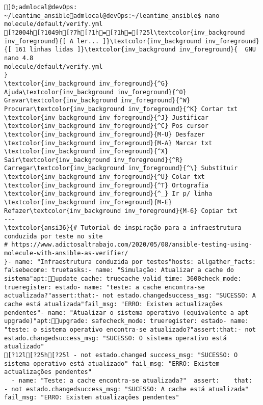 \documentclass{scrartcl}
\title{}
\begin{document}
\begin{Verbatim}
]0;admlocal@devOps: ~/leantime_ansibleadmlocal@devOps:~/leantime_ansible$ nano molecule/default/verify.yml 
[?2004h[?1049h[?7h[?1h=[?1h=[?25l\textcolor{inv_background inv_foreground}{[ A ler... ]}\textcolor{inv_background inv_foreground}{[ 161 linhas lidas ]}\textcolor{inv_background inv_foreground}{  GNU nano 4.8                                          molecule/default/verify.yml                                                       }
\textcolor{inv_background inv_foreground}{^G} Ajuda\textcolor{inv_background inv_foreground}{^O} Gravar\textcolor{inv_background inv_foreground}{^W} Procurar\textcolor{inv_background inv_foreground}{^K} Cortar txt    \textcolor{inv_background inv_foreground}{^J} Justificar    \textcolor{inv_background inv_foreground}{^C} Pos cursor    \textcolor{inv_background inv_foreground}{M-U} Desfazer     \textcolor{inv_background inv_foreground}{M-A} Marcar txt
\textcolor{inv_background inv_foreground}{^X} Sair\textcolor{inv_background inv_foreground}{^R} Carregar\textcolor{inv_background inv_foreground}{^\} Substituir    \textcolor{inv_background inv_foreground}{^U} Colar txt     \textcolor{inv_background inv_foreground}{^T} Ortografia    \textcolor{inv_background inv_foreground}{^_} Ir p/ linha   \textcolor{inv_background inv_foreground}{M-E} Refazer\textcolor{inv_background inv_foreground}{M-6} Copiar txt
---
\textcolor{ansi36}{# Tutorial de inspiração para a infraestrutura conduzida por teste no site
# https://www.adictosaltrabajo.com/2020/05/08/ansible-testing-using-molecule-with-ansible-as-verifier/
}- name: "Infraestrutura conduzida por testes"hosts: allgather_facts: falsebecome: truetasks:- name: "Simulação: Atualizar a cache do sistema"apt:update_cache: truecache_valid_time: 3600check_mode: trueregister: estado- name: "teste: a cache encontra-se actualizada?"assert:that:- not estado.changedsuccess_msg: "SUCESSO: A cache está atualizada"fail_msg: "ERRO: Existem actualizações pendentes"- name: "Atualizar o sistema operativo (equivalente a apt upgrade)"apt:upgrade: safecheck_mode: trueregister: estado- name: "teste: o sistema operativo encontra-se atualizado?"assert:that:- not estado.changedsuccess_msg: "SUCESSO: O sistema operativo está atualizado"
[?12l[?25h[?25l - not estado.changed success_msg: "SUCESSO: O sistema operativo está atualizado" fail_msg: "ERRO: Existem actualizações pendentes"
  - name: "Teste: a cache encontra-se atualizada?"  assert:    that:    - not estado.changedsuccess_msg: "SUCESSO: A cache está atualizada"    fail_msg: "ERRO: Existem atualizações pendentes"

\end{Verbatim}
\end{document}

